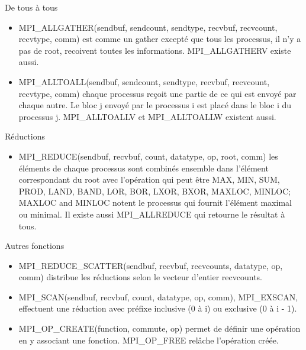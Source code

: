 \documentclass[10pt]{beamer}
\begin{document}
\begin{frame}{De tous à tous}

  \begin{itemize}
    \item MPI\_ALLGATHER(sendbuf, sendcount, sendtype, recvbuf, recvcount, recvtype, comm) est comme un gather excepté que tous les processus, il n'y a pas de root, recoivent toutes les informations. MPI\_ALLGATHERV existe aussi.

    \item MPI\_ALLTOALL(sendbuf, sendcount, sendtype, recvbuf, recvcount, recvtype, comm) chaque processus reçoit une partie de ce qui est envoyé par chaque autre. Le bloc j envoyé par le processus i est placé dans le bloc i du processus j. MPI\_ALLTOALLV et MPI\_ALLTOALLW existent aussi.
  \end{itemize}
\end{frame}

\begin{frame}{Réductions}

  \begin{itemize}
    \item MPI\_REDUCE(sendbuf, recvbuf, count, datatype, op, root, comm) les éléments de chaque processus sont combinés ensemble dans l'élément correspondant du root avec l'opération qui peut être MAX, MIN, SUM, PROD, LAND, BAND, LOR, BOR, LXOR, BXOR, MAXLOC, MINLOC; MAXLOC and MINLOC notent le processus qui fournit l'élément maximal ou minimal. Il existe aussi MPI\_ALLREDUCE qui retourne le résultat à tous.
  \end{itemize}
\end{frame}

\begin{frame}{Autres fonctions}

  \begin{itemize}
    \item MPI\_REDUCE\_SCATTER(sendbuf, recvbuf, recvcounts, datatype, op, comm) distribue les réductions selon le vecteur d'entier recvcounts.

    \item MPI\_SCAN(sendbuf, recvbuf, count, datatype, op, comm), MPI\_EXSCAN, effectuent une réduction avec préfixe inclusive (0 à i) ou exclusive (0 à i - 1).

    \item MPI\_OP\_CREATE(function, commute, op) permet de définir une opération en y associant une fonction. MPI\_OP\_FREE relâche l'opération créée.
  \end{itemize}
\end{frame}
\end{document}
